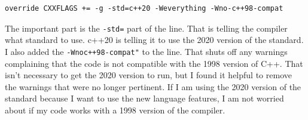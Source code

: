 \begin{verbatim}
override CXXFLAGS += -g -std=c++20 -Weverything -Wno-c++98-compat
\end{verbatim}

The important part is the {\tt -std=} part of the line. That is telling the compiler what standard to use. c++20 is telling it to use the 2020 version of the standard. I also added the {\tt -Wnoc++98-compat"} to the line. That shuts off any warnings complaining that the code is not compatible with the 1998 version of C++. That isn't necessary to get the 2020 version to run, but I found it helpful to remove the warnings that were no longer pertinent. If I am using the 2020 version of the standard because I want to use the new language features, I am not worried about if my code works with a 1998 version of the compiler.
